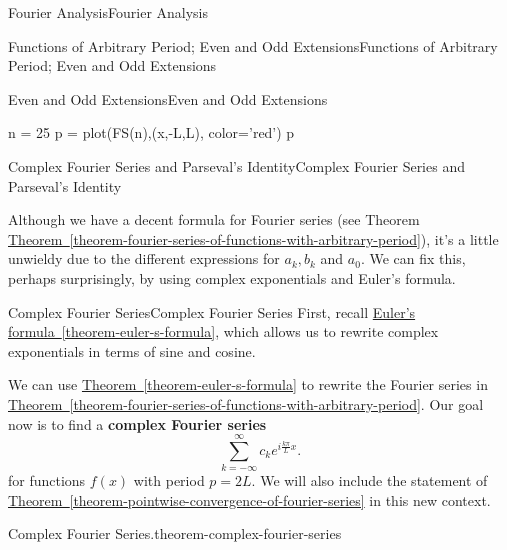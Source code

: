 \documentclass[10pt,]{book}
\newcommand{\terminology}[1]{\textbf{#1}}
\numberwithin{equation}{section}
\begin{document}
\begin{chapterptx}{Fourier Analysis}{}{Fourier Analysis}{}{}
\begin{sectionptx}{Functions of Arbitrary Period; Even and Odd Extensions}{}{Functions of Arbitrary Period; Even and Odd Extensions}{}{}
\begin{subsectionptx}{Even and Odd Extensions}{}{Even and Odd Extensions}{}{}
\begin{sageinput}
n = 25
p = plot(FS(n),(x,-L,L), color='red')
p
\end{sageinput}
\end{subsectionptx}
\end{sectionptx}
%
%
\typeout{************************************************}
\typeout{************************************************}
%
\begin{sectionptx}{Complex Fourier Series and Parseval's Identity}{}{Complex Fourier Series and Parseval's Identity}{}{}\label{section-complex-fourier-series-and-parsevals-identity}
\begin{introduction}{}%
\hypertarget{p-407}{}%
Although we have a decent formula for Fourier series (see Theorem \hyperref[theorem-fourier-series-of-functions-with-arbitrary-period]{Theorem~\ref{theorem-fourier-series-of-functions-with-arbitrary-period}}), it's a little unwieldy due to the different expressions for \(a_{k},b_{k}\) and \(a_{0}\). We can fix this, perhaps surprisingly, by using complex exponentials and Euler's formula.%
\end{introduction}%
%
%
\typeout{************************************************}
\typeout{************************************************}
%
\begin{subsectionptx}{Complex Fourier Series}{}{Complex Fourier Series}{}{}\label{subsection-complex-fourier-series}
\hypertarget{p-408}{}%
First, recall \hyperref[theorem-euler-s-formula]{Euler's formula~\ref{theorem-euler-s-formula}}, which allows us to rewrite complex exponentials in terms of sine and cosine.%
\par
\hypertarget{p-409}{}%
We can use \hyperref[theorem-euler-s-formula]{Theorem~\ref{theorem-euler-s-formula}} to rewrite the Fourier series in \hyperref[theorem-fourier-series-of-functions-with-arbitrary-period]{Theorem~\ref{theorem-fourier-series-of-functions-with-arbitrary-period}}. Our goal now is to find a \terminology{complex Fourier series}%
\begin{equation*}
\sum_{k=-\infty}^{\infty}c_{k}e^{i\frac{k\pi}{L}x}.
\end{equation*}
for functions \(f(x)\) with period \(p=2L\). We will also include the statement of \hyperref[theorem-pointwise-convergence-of-fourier-series]{Theorem~\ref{theorem-pointwise-convergence-of-fourier-series}} in this new context.%
\begin{theorem}{Complex Fourier Series.}{}{theorem-complex-fourier-series}%

\end{theorem}
\end{subsectionptx}
\end{sectionptx}
\end{chapterptx}
\end{document}
